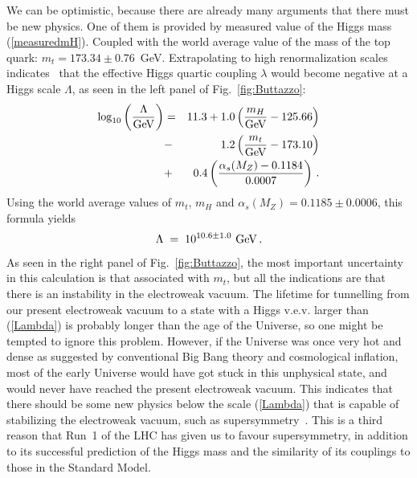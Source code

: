 \documentclass[12pt]{article}
\numberwithin{equation}{section}
\begin{document}
We can be optimistic, because there are already many arguments that
there must be new physics. One of them is provided by measured value of the Higgs mass (\ref{measuredmH}).
Coupled with the world average value of the mass of the top quark: $m_t = 173.34 \pm 0.76$~GeV.
Extrapolating to high renormalization scales indicates~\cite{Buttazzo} that the effective Higgs quartic coupling $\lambda$
would become negative at a Higgs scale $\Lambda$, as seen in the left panel of Fig.~\ref{fig:Buttazzo}:
\begin{eqnarray}
\log_{10} \left( \frac{\Lambda}{{\rm GeV}} \right) & = & 11.3 + 1.0 \left(\frac{m_H}{{\rm GeV}} - 125.66 \right) \nonumber \\
& - & 1.2 \left( \frac{m_t}{{\rm GeV}} - 173.10 \right) \nonumber \\
& + & 0.4 \left(\frac{\alpha_s(M_Z) - 0.1184}{0.0007} \right) \, .
\label{Buttazzo}
\end{eqnarray}
Using the world average values of $m_t$, $m_H$ and $\alpha_s (M_Z) = 0.1185 \pm 0.0006$, this formula yields
\begin{equation}
\Lambda \; = \; 10^{10.6 \pm 1.0}~{\rm GeV} \, .
\label{Lambda}
\end{equation}
As seen in the right panel of Fig.~\ref{fig:Buttazzo}, the most important uncertainty in this calculation is that associated with $m_t$, but all the indications
are that there is an instability in the electroweak vacuum. The lifetime for tunnelling from our present
electroweak vacuum to a state with a Higgs v.e.v. larger than (\ref{Lambda}) is probably longer than the
age of the Universe, so one might be tempted to ignore this problem.
However, if the Universe was once very hot and dense as suggested by conventional Big Bang theory
and cosmological inflation, most of the early Universe would have got stuck in this unphysical state, and
would never have reached the present electroweak vacuum. This indicates that there should be some
new physics below the scale (\ref{Lambda}) that is capable of stabilizing the electroweak vacuum,
such as supersymmetry~\cite{ER}. This is a third reason that Run~1 of the LHC has given us to favour supersymmetry,
in addition to its successful prediction of the Higgs mass and the similarity of its couplings to those in the Standard Model.
\end{document}
